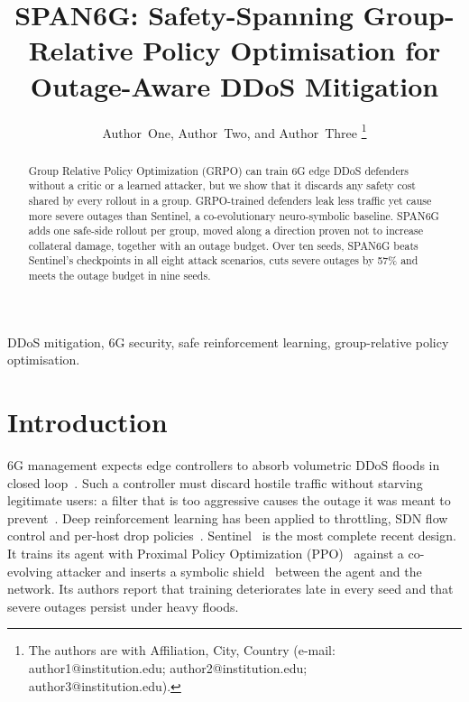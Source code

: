 \documentclass[journal]{IEEEtran}
\begin{document}
\title{SPAN6G: Safety-Spanning Group-Relative Policy Optimisation for Outage-Aware DDoS Mitigation}

\author{Author~One, Author~Two, and Author~Three%
\thanks{The authors are with Affiliation, City, Country (e-mail: author1@institution.edu; author2@institution.edu; author3@institution.edu).}}


\maketitle

\begin{abstract}
Group Relative Policy Optimization (GRPO) can train 6G edge DDoS defenders without a critic or a learned attacker, but we show that it discards any safety cost shared by every rollout in a group. GRPO-trained defenders leak less traffic yet cause more severe outages than Sentinel, a co-evolutionary neuro-symbolic baseline. SPAN6G adds one safe-side rollout per group, moved along a direction proven not to increase collateral damage, together with an outage budget. Over ten seeds, SPAN6G beats Sentinel's checkpoints in all eight attack scenarios, cuts severe outages by 57\% and meets the outage budget in nine seeds.
\end{abstract}

\begin{IEEEkeywords}
DDoS mitigation, 6G security, safe reinforcement learning, group-relative policy optimisation.
\end{IEEEkeywords}

\section{Introduction}
 6G management expects edge controllers to absorb volumetric DDoS floods in closed loop~\cite{benzaid2020zsm,liyanage2023oran}. Such a controller must discard hostile traffic without starving legitimate users: a filter that is too aggressive causes the outage it was meant to prevent~\cite{guo2020xai6g}. Deep reinforcement learning has been applied to throttling, SDN flow control and per-host drop policies~\cite{malialis2015distributed,liu2018drlddos,simpson2020perhost}. Sentinel~\cite{alfatemi2026sentinel} is the most complete recent design. It trains its agent with Proximal Policy Optimization (PPO)~\cite{schulman2017ppo} against a co-evolving attacker and inserts a symbolic shield~\cite{alshiekh2018shielding} between the agent and the network. Its authors report that training deteriorates late in every seed and that severe outages persist under heavy floods.
\end{document}
